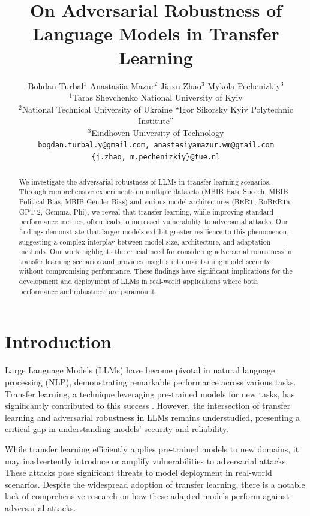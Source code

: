 \documentclass{article}
\title{On Adversarial Robustness of Language Models in Transfer Learning}
\author{
Bohdan Turbal$^{1}$ \quad Anastasiia Mazur$^{2}$ \quad Jiaxu Zhao$^{3}$ \quad
Mykola Pechenizkiy$^{3}$ \\
$^1$Taras Shevchenko National University of Kyiv \quad \\ $^2$National Technical University of Ukraine
“Igor Sikorsky Kyiv Polytechnic Institute”  \\ \quad $^3$Eindhoven University of Technology\\
\texttt{bogdan.turbal.y@gmail.com, anastasiyamazur.wm@gmail.com} \\ 
\texttt{\{j.zhao, m.pechenizkiy\}@tue.nl}
}
\begin{document}
\maketitle

\begin{abstract}
We investigate the adversarial robustness of LLMs in transfer learning scenarios. Through comprehensive experiments on multiple datasets (MBIB Hate Speech, MBIB Political Bias, MBIB Gender Bias) and various model architectures (BERT, RoBERTa, GPT-2, Gemma, Phi), we reveal that transfer learning, while improving standard performance metrics, often leads to increased vulnerability to adversarial attacks. Our findings demonstrate that larger models exhibit greater resilience to this phenomenon, suggesting a complex interplay between model size, architecture, and adaptation methods. Our work highlights the crucial need for considering adversarial robustness in transfer learning scenarios and provides insights into maintaining model security without compromising performance. These findings have significant implications for the development and deployment of LLMs in real-world applications where both performance and robustness are paramount.
\end{abstract}

\section{Introduction}

Large Language Models (LLMs) have become pivotal in natural language processing (NLP), demonstrating remarkable performance across various tasks. Transfer learning, a technique leveraging pre-trained models for new tasks, has significantly contributed to this success \cite{gururangan2020don}. However, the intersection of transfer learning and adversarial robustness in LLMs remains understudied, presenting a critical gap in understanding models' security and reliability.

While transfer learning efficiently applies pre-trained models to new domains, it may inadvertently introduce or amplify vulnerabilities to adversarial attacks. These attacks pose significant threats to model deployment in real-world scenarios. Despite the widespread adoption of transfer learning, there is a notable lack of comprehensive research on how these adapted models perform against adversarial attacks. 
\end{document}
